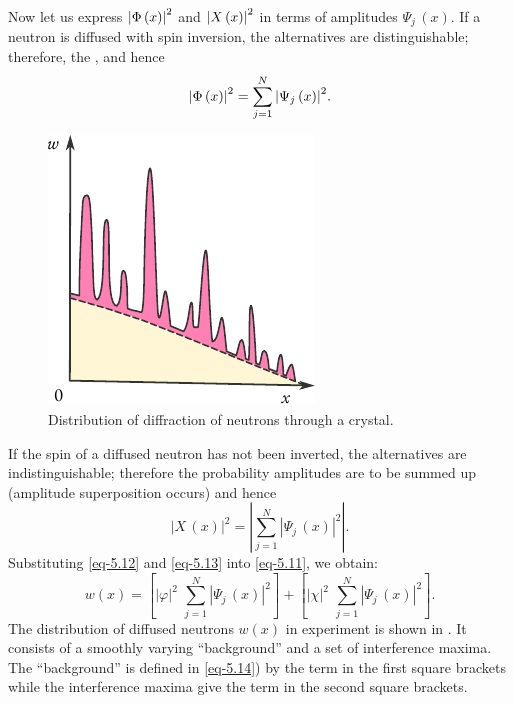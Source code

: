 Now let us express $ \abs{\Phi \, (x) }^{2}$ and $ \abs{X \, (x) }^{2}$ in terms of amplitudes  $\Psi_{j} \, (x)$. If a neutron is diffused with spin inversion, the alternatives are distinguishable; therefore, the , and hence
\begin{equation}%
\abs{\Phi \, (x) }^{2} = \sum_{j=1}^{N} \abs{\Psi_{j} \, (x) }^{2}.
\label{eq-5.12}
\end{equation}
\begin{figure}%
\centering
\includegraphics[width=\textwidth]{figures/neutron-dist.pdf}
\caption{Distribution of diffraction of neutrons through a crystal.
\label{neutron-dist}}
\end{figure}
If the spin of a diffused neutron has not been inverted, the alternatives
are indistinguishable; therefore the probability amplitudes are to be
summed up (amplitude superposition occurs) and hence
\begin{equation}%
|X \, (x) |^{2} = \left| \sum_{j=1}^{N} |\Psi_{j} \, (x) |^{2} \right|.
\label{eq-5.13}
\end{equation}
Substituting \eqref{eq-5.12} and \eqref{eq-5.13} into \eqref{eq-5.11}, we obtain:
\begin{equation}%
w(x) = \left[  |\varphi |^{2} \,\,  \sum_{j=1}^{N} |\Psi_{j} \, (x) |^{2} \right] + \left[  |\chi |^{2} \,\,  \sum_{j=1}^{N} |\Psi_{j} \, (x) |^{2} \right] . 
\label{eq-5.14}
\end{equation}
The distribution of diffused neutrons $w(x)$ in experiment is shown in
. It consists of a smoothly varying ``background'' and a set of interference maxima. The ``background'' is defined in \eqref{eq-5.14}) by the term in the first square brackets while the interference maxima give the term in the second square brackets.

